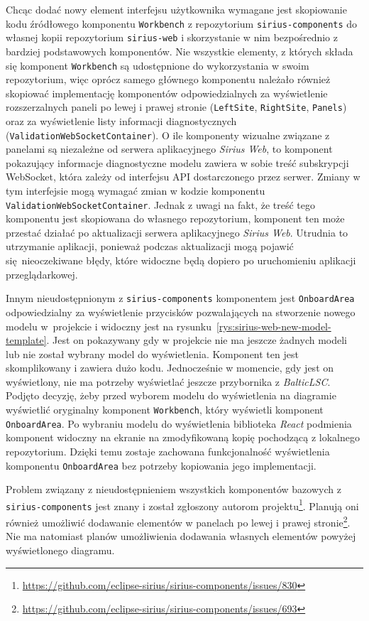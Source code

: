 Chcąc dodać nowy element interfejsu użytkownika wymagane jest skopiowanie kodu
źródłowego komponentu \texttt{Workbench} z repozytorium
\texttt{sirius-components} do własnej kopii repozytorium \texttt{sirius-web} i
skorzystanie w nim bezpośrednio z bardziej podstawowych komponentów.
Nie wszystkie elementy, z których składa się komponent \texttt{Workbench} są
udostępnione do wykorzystania w swoim repozytorium, więc oprócz samego głównego
komponentu należało również skopiować
implementację komponentów odpowiedzialnych za wyświetlenie rozszerzalnych
paneli po lewej i prawej stronie (\texttt{LeftSite}, \texttt{RightSite},
\texttt{Panels}) oraz za wyświetlenie listy informacji diagnostycznych
(\texttt{ValidationWebSocketContainer}). O ile komponenty wizualne związane z
panelami są niezależne od serwera aplikacyjnego \emph{Sirius Web}, to komponent
pokazujący
informacje diagnostyczne modelu zawiera w sobie treść subskrypcji WebSocket,
która zależy od interfejsu \gls{API} dostarczonego przez serwer. Zmiany w tym
interfejsie mogą wymagać zmian w kodzie komponentu
\texttt{ValidationWebSocketContainer}. Jednak z uwagi na fakt, że treść tego
komponentu jest skopiowana do własnego repozytorium, komponent ten może
przestać działać po aktualizacji serwera aplikacyjnego \emph{Sirius Web}.
Utrudnia to utrzymanie aplikacji, ponieważ podczas aktualizacji mogą pojawić
się nieoczekiwane błędy, które widoczne będą dopiero po uruchomieniu aplikacji
przeglądarkowej.

Innym nieudostępnionym z \texttt{sirius-components} komponentem jest
\texttt{OnboardArea}
odpowiedzialny za wyświetlenie przycisków pozwalających na stworzenie nowego
modelu w~projekcie i widoczny jest na
rysunku~\ref{rys:sirius-web-new-model-template}. Jest on pokazywany gdy w
projekcie nie ma jeszcze żadnych
modeli lub nie został wybrany model do wyświetlenia.
Komponent ten jest skomplikowany i zawiera dużo kodu. Jednocześnie w momencie,
gdy jest on wyświetlony, nie ma potrzeby wyświetlać jeszcze przybornika z
\emph{BalticLSC}. Podjęto decyzję, żeby przed wyborem modelu do wyświetlenia na
diagramie wyświetlić oryginalny komponent \texttt{Workbench}, który wyświetli
komponent \texttt{OnboardArea}. Po wybraniu modelu do wyświetlenia biblioteka
\emph{React} podmienia komponent widoczny na ekranie na zmodyfikowaną kopię
pochodzącą z lokalnego repozytorium. Dzięki temu zostaje zachowana
funkcjonalność wyświetlenia komponentu \texttt{OnboardArea} bez potrzeby
kopiowania jego implementacji.

Problem związany z nieudostępnieniem wszystkich komponentów bazowych z
\texttt{sirius-\allowbreak components} %
jest znany i został zgłoszony autorom
projektu\footnote{
	\url{https://github.com/eclipse-sirius/sirius-components/issues/830}}.
Planują oni również umożliwić dodawanie elementów w panelach po lewej i prawej
stronie\footnote{
	\url{https://github.com/eclipse-sirius/sirius-components/issues/693}}.
Nie ma
natomiast planów umożliwienia dodawania własnych elementów powyżej
wyświetlonego diagramu.

